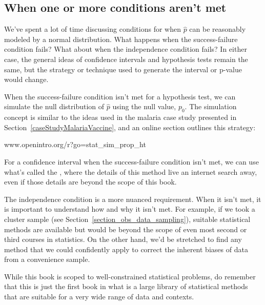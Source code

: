 


\D{\newpage}

\subsection{When one or more conditions aren't met}

We've spent a lot of time discussing conditions for when
$\hat{p}$ can be reasonably modeled by a normal distribution.
What happens when the success-failure condition fails?
What about when the independence condition fails?
In either case, the general ideas of confidence intervals
and hypothesis tests remain the same, but the strategy
or technique used to generate the interval or p-value
would change.

When the success-failure condition isn't met
for a hypothesis test, we can simulate the null distribution
of $\hat{p}$ using the null value, $p_0$.
The simulation concept is similar to the ideas used
in the malaria case study presented in
Section~\ref{caseStudyMalariaVaccine},
and an online section outlines this strategy:
\begin{center}
    {www.openintro.org/r?go=stat\_sim\_prop\_ht}
\end{center}
For a confidence interval when the success-failure condition
isn't met, we can use what's called
the ,
where the details of this method live an internet search away,
even if those details are beyond the scope of this book.

The independence condition is a more nuanced requirement.
When it isn't met, it is important to understand how and why
it isn't met.
For example, if we took a cluster sample
(see Section~\ref{section_obs_data_sampling}),
suitable statistical methods are available but would
be beyond the scope of even most second or third courses
in statistics.
On the other hand, we'd be stretched to find any method
that we could confidently apply to correct the inherent biases
of data from a convenience sample.

While this book is scoped to well-constrained statistical
problems, do remember that this is just the first
book in what is a large library of statistical methods that
are suitable for a very wide range of data and contexts.


